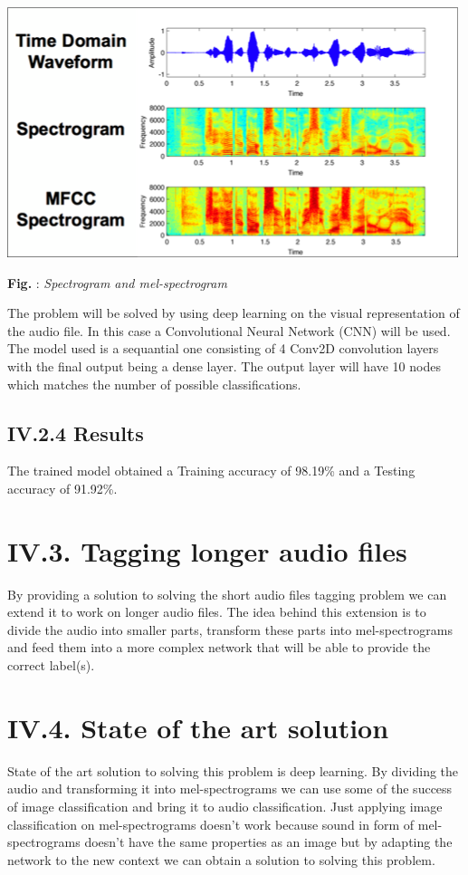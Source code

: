 \documentclass[11pt, a4papper]{report}
\theoremstyle{plain}
\theoremstyle{definition}
\theoremstyle{definition}
\theoremstyle{proposition}
\begin{document}
\begin{center}
\includegraphics[scale=0.8]{sound-representation.png}
\end{center}
\begin{center}
\textbf{Fig. }: \textit{Spectrogram and mel-spectrogram}
\end{center}

The problem will be solved by using deep learning on the visual representation of the audio file. In this case a Convolutional Neural Network (CNN) will be used. The model used is a sequantial one consisting of 4 Conv2D convolution layers with the final output being a dense layer. The output layer will have 10 nodes which matches the number of possible classifications.

\subsection*{IV.2.4 Results}
The trained model obtained a Training accuracy of 98.19\% and a Testing accuracy of 91.92\%.

\section*{IV.3. Tagging longer audio files}

By providing a solution to solving the short audio files tagging problem we can extend it to work on longer audio files. The idea behind this extension is to divide the audio into smaller parts, transform these parts into mel-spectrograms and feed them into a more complex network that will be able to provide the correct label(s).

\section*{IV.4. State of the art solution}
State of the art solution to solving this problem is deep learning. By dividing the audio and transforming it into mel-spectrograms \cite{14} we can use some of the success of image classification and bring it to audio classification. Just applying image classification on mel-spectrograms doesn't work because sound in form of mel-spectrograms doesn't have the same properties as an image but by adapting the network to the new context we can obtain a solution to solving this problem.
\end{document}
